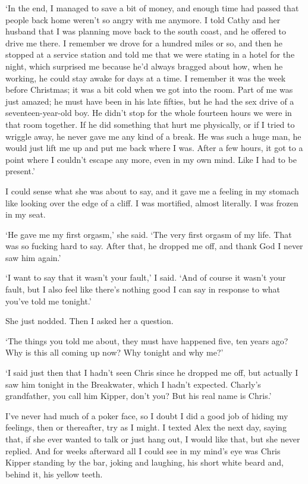 `In the end, I managed to save a bit of money, and enough time had passed that people back home weren't so angry with me anymore. I told Cathy and her husband that I was planning move back to the south coast, and he offered to drive me there. I remember we drove for a hundred miles or so, and then he stopped at a service station and told me that we were stating in a hotel for the night, which surprised me because he'd always bragged about how, when he working, he could stay awake for days at a time. I remember it was the week before Christmas; it was a bit cold when we got into the room. Part of me was just amazed; he must have been in his late fifties, but he had the sex drive of a seventeen-year-old boy. He didn't stop for the whole fourteen hours we were in that room together. If he did something that hurt me physically, or if I tried to wriggle away, he never gave me any kind of a break. He was such a huge man, he would just lift me up and put me back where I was. After a few hours, it got to a point where I couldn't escape any more, even in my own mind. Like I had to be present.'

I could sense what she was about to say, and it gave me a feeling in my stomach like looking over the edge of a cliff. I was mortified, almost literally. I was frozen in my seat.

`He gave me my first orgasm,' she said. `The very first orgasm of my life. That was so fucking hard to say. After that, he dropped me off, and thank God I never saw him again.'

`I want to say that it wasn't your fault,' I said. `And of course it wasn't your fault, but I also feel like there's nothing good I can say in response to what you've told me tonight.'

She just nodded. Then I asked her a question.

`The things you told me about, they must have happened five, ten years ago? Why is this all coming up now? Why tonight and why me?'

`I said just then that I hadn't seen Chris since he dropped me off, but actually I saw him tonight in the Breakwater, which I hadn't expected. Charly's grandfather, you call him Kipper, don't you? But his real name is Chris.'

I've never had much of a poker face, so I doubt I did a good job  of hiding my feelings, then or thereafter, try as I might. I texted Alex the next day, saying that, if she ever wanted to talk or just hang out, I would like that, but she never replied. And for weeks afterward all I could see in my mind's eye was Chris Kipper standing by the bar, joking and laughing, his short white beard and, behind it, his yellow teeth.
